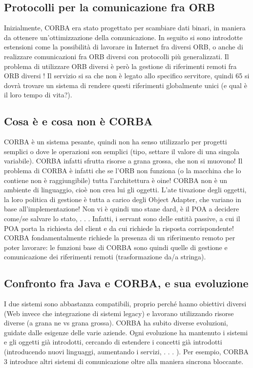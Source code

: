 \subsection{Protocolli per la comunicazione fra ORB}
Inizialmente, CORBA era stato progettato per scambiare dati binari, in maniera
da ottenere un'ottimizzazione della comunicazione. In seguito si sono introdotte
estensioni come la possibilità di lavorare in Internet fra diversi ORB, o anche di
realizzare comunicazioni fra ORB diversi con protocolli più generalizzati.
Il problema di utilizzare ORB diversi è però la gestione di riferimenti remoti
fra ORB diversi ! Il servizio si sa che non è legato allo specifico servitore, quindi
65
si dovrà trovare un sistema di rendere questi riferimenti globalmente unici (e
qual è il loro tempo di vita?).
\subsection{Cosa è e cosa non è CORBA}
CORBA è un sistema pesante, quindi non ha senso utilizzarlo per progetti
semplici o dove le operazioni son semplici (tipo, settare il valore di una singola
variabile). CORBA infatti sfrutta risorse a grana grossa, che non si muovono!
Il problema di CORBA è infatti che se l'ORB non funziona (o la macchina che
lo contiene non è raggiungibile) tutta l'architettura è oine!
CORBA non è un ambiente di linguaggio, cioè non crea lui gli oggetti. L'ate
tivazione degli oggetti, la loro politica di gestione è tutta a carico degli Object
Adapter, che variano in base all'implementazione! Non vi è quindi uno stane
dard, è il POA a decidere come/se salvare lo stato, . . . Infatti, i servant sono
delle entità passive, a cui il POA porta la richiesta del client e da cui richiede
la risposta corrispondente!
CORBA fondamentalmente richiede la presenza di un riferimento remoto
per poter lavorare: le funzioni base di CORBA sono quindi quelle di gestione e
comunicazione dei riferimenti remoti (trasformazione da/a stringa).
\subsection{Confronto fra Java e CORBA, e sua evoluzione}
I due sistemi sono abbastanza compatibili, proprio perché hanno obiettivi diversi
(Web invece che integrazione di sistemi legacy) e lavorano utilizzando risorse
diverse (a grana ne vs grana grossa).
CORBA ha subito diverse evoluzioni, guidate dalle esigenze delle varie aziende.
Ogni evoluzione ha mantenuto i sistemi e gli oggetti già introdotti, cercando di
estendere i concetti già introdotti (introducendo nuovi linguaggi, aumentando i
servizi, . . . ). Per esempio, CORBA 3 introduce altri sistemi di comunicazione
oltre alla maniera sincrona bloccante.
